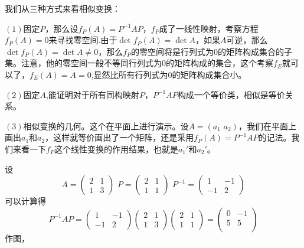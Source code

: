 \documentclass[11pt,a4paper,openany]{book}%
\theoremstyle{plain}%
\newcommand{\NO}[1]{{$(#1)$}}%
\begin{document}
我们从三种方式来看相似变换：

\NO{1}固定$P$，那么设$f_P(A)=P^{-1}AP$，$f_P$成了一线性映射，考察方程$f_P(A)=0$来寻找零空间.由于$\det f_P(A)=\det A$，如果$A$可逆，那么$\det f_P(A)=\det A\neq0$，那么$f_P$的零空间将是行列式为0的矩阵构成集合的子集。注意，他的零空间一般不等同行列式为0的矩阵构成的集合，这个考察$f_E$就可以了，$f_E(A)=A=0$,显然比所有行列式为0的矩阵构成集合小。

\NO{2}固定$A$,能证明对于所有同构映射$P$，$P^{-1}AP$构成一个等价类，相似是等价关系。

\NO{3}相似变换的几何。这个在平面上进行演示。设$A=(a_1\,\,a_2)$，我们在平面上画出$a_1$和$a_2$，这样就等价画出了一个矩阵，还是采用$f_P(A)=P^{-1}AP$的记法。我们来看一下$f_P$这个线性变换的作用结果，也就是$a_1'$和$a_2'$。

设
\[
A=
\begin{pmatrix}
2&1\\
1&3
\end{pmatrix}
\,\, P=
\begin{pmatrix}
2&1\\
1&1
\end{pmatrix}
\,\, P^{-1}=
\begin{pmatrix}
1&-1\\
-1&2
\end{pmatrix}
\]
可以计算得
\[
P^{-1}AP=
\begin{pmatrix}
1&-1\\
-1&2
\end{pmatrix}
\begin{pmatrix}
2&1\\
1&3
\end{pmatrix}
\begin{pmatrix}
2&1\\
1&1
\end{pmatrix}
=
\begin{pmatrix}
 0 & -1 \\
 5 & 5 \\
\end{pmatrix}
\]
作图，
\begin{center}
\end{center}
\end{document}
